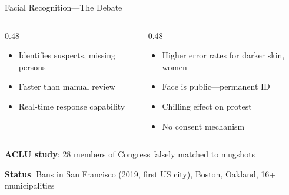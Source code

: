 ﻿\documentclass[aspectratio=169,11pt]{beamer}
\begin{document}
\begin{frame}{Facial Recognition---The Debate}
\begin{columns}[T]
\begin{column}{0.48\textwidth}
\begin{probox}
\small
\begin{itemize}
    \item Identifies suspects, missing persons
    \item Faster than manual review
    \item Real-time response capability
\end{itemize}
\end{probox}
\end{column}
\begin{column}{0.48\textwidth}
\begin{objectionbox}
\small
\begin{itemize}
    \item Higher error rates for darker skin, women
    \item Face is public---permanent ID
    \item Chilling effect on protest
    \item No consent mechanism
\end{itemize}
\end{objectionbox}
\end{column}
\end{columns}

\vspace{0.3em}
\textbf{ACLU study}: 28 members of Congress falsely matched to mugshots

\textbf{Status}: Bans in San Francisco (2019, first US city), Boston, Oakland, 16+ municipalities
\end{frame}
\end{document}
